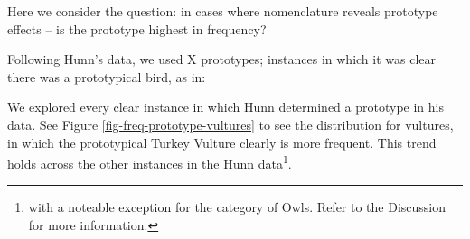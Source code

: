 \documentclass[10pt,letterpaper]{article}
\begin{document}

Here we consider the question: in cases where nomenclature reveals prototype effects -- is the prototype highest in frequency?

Following Hunn's data\cite{hunn2008zapotec}, we used X prototypes; instances in which it was clear there was a prototypical bird, as in: 




We explored every clear instance in which Hunn determined a prototype in his data. See Figure \ref{fig-freq-prototype-vultures} to see the distribution for vultures, in which the prototypical Turkey Vulture clearly is more frequent. This trend holds across the other instances in the Hunn data\footnote{with a noteable exception for the category of Owls. Refer to the Discussion for more information.}.
\end{document}
